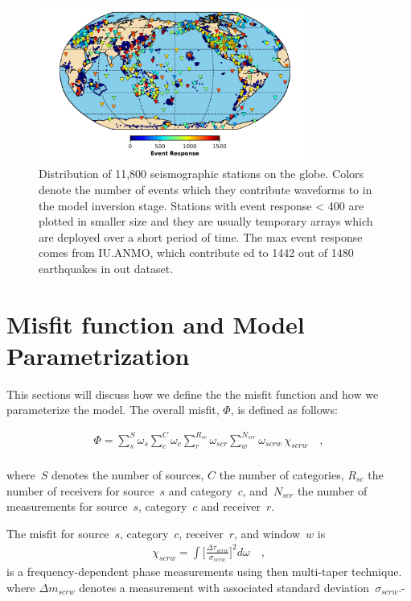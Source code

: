 \documentclass[extra,mreferee]{gji}
\begin{document}
\begin{figure}
  \includegraphics[width=0.8\textwidth]{figures/station_map.pdf}
  \caption{Distribution of 11,800 seismographic stations on the globe. Colors denote the number of events which they contribute waveforms to in the model inversion stage. Stations with event response < 400 are plotted in smaller size and they are usually temporary arrays which are deployed over a short period of time. The max event response comes from IU.ANMO, which contribute ed to 1442 out of 1480 earthquakes in out dataset.}
  \label{fig:stations}
  \centering
\end{figure}

\section{Misfit function and Model Parametrization}

This sections will discuss how we define the the misfit function and how we parameterize the model.
The overall misfit, $\Phi$, is defined as follows:

\begin{align}
\label{eq:misfit}
\Phi = \sum_{s}^{S} \omega_s \sum_{c}^{C} \omega_{c} \sum_{r}^{R_{sc}} \omega_{scr} \sum_{w}^{N_{scr}} \omega_{scrw}\, \chi_{scrw}
\quad ,
\end{align}\\
where~$S$ denotes the number of sources, $C$ the number of categories,
$R_{sc}$ the number of receivers for source~$s$ and category~$c$,
and~$N_{scr}$ the number of measurements for source~$s$, category~$c$
and receiver~$r$.

The misfit for source~$s$, category~$c$, receiver~$r$, and window~$w$ is
\begin{align}
  \chi_{scrw} = \int \Big[ \frac {\Delta \tau_{scrw}} {\sigma_{scrw}} \Big]^2 d\omega
\quad ,
\end{align}
is a frequency-dependent phase measurements using then multi-taper technique.
where $\Delta m_{scrw}$ denotes a measurement with associated standard deviation~$\sigma_{scrw}$.-
\end{document}
